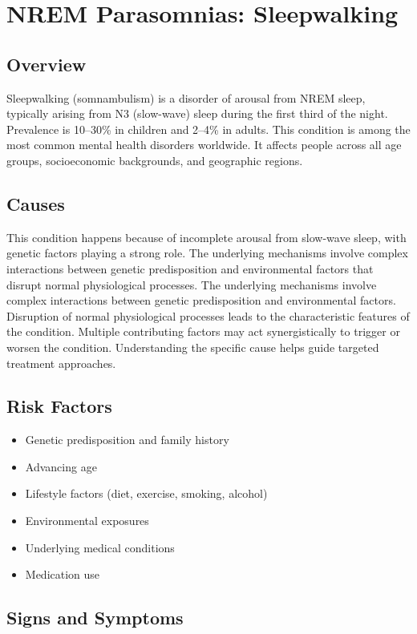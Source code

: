 \chapter{NREM Parasomnias: Sleepwalking}
\label{sec:Sleepwalking}

\section{Overview}
Sleepwalking (somnambulism) is a disorder of arousal from NREM sleep, typically arising from N3 (slow-wave) sleep during the first third of the night. Prevalence is 10--30\% in children and 2--4\% in adults. This condition is among the most common mental health disorders worldwide. It affects people across all age groups, socioeconomic backgrounds, and geographic regions.
\section{Causes}
This condition happens because of incomplete arousal from slow-wave sleep, with genetic factors playing a strong role. The underlying mechanisms involve complex interactions between genetic predisposition and environmental factors that disrupt normal physiological processes. The underlying mechanisms involve complex interactions between genetic predisposition and environmental factors. Disruption of normal physiological processes leads to the characteristic features of the condition. Multiple contributing factors may act synergistically to trigger or worsen the condition. Understanding the specific cause helps guide targeted treatment approaches.
\section{Risk Factors}


\begin{itemize}[noitemsep]
  \item Genetic predisposition and family history
  \item Advancing age
  \item Lifestyle factors (diet, exercise, smoking, alcohol)
  \item Environmental exposures
  \item Underlying medical conditions
  \item Medication use
\end{itemize}
\section{Signs and Symptoms}

